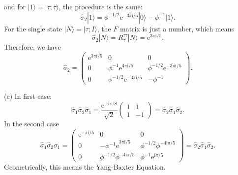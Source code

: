 \documentclass{book}
\begin{document}
and for $|1 \rangle =|\tau ;\tau \rangle $, the procedure is the same:
\begin{equation*}
\hat{\sigma }_{2} |1\rangle =\phi ^{-1/2}\mathrm{e}^{-3\pi \mathrm{i} /5} |0 \rangle -\phi ^{-1} |1 \rangle .
\end{equation*}
For the single state $|N \rangle =|\tau ;I \rangle $, the $F$ matrix is just a number, which means
\begin{equation*}
\hat{\sigma }_{2} |N\rangle =R_{\tau }^{\tau \tau } |N\rangle =\mathrm{e}^{3\pi \mathrm{i} /5} .
\end{equation*}
Therefore, we have
\begin{equation*}
\hat{\sigma }_{2} =\begin{pmatrix}
\mathrm{e}^{3\pi \mathrm{i} /5} & 0 & 0\\
0 & \phi ^{-1}\mathrm{e}^{4\pi \mathrm{i} /5} & \phi ^{-1/2}\mathrm{e}^{-3\pi \mathrm{i} /5}\\
0 & \phi ^{-1/2}\mathrm{e}^{-3\pi \mathrm{i} /5} & -\phi ^{-1}
\end{pmatrix} .
\end{equation*}


(c) In first case:
\begin{equation*}
\hat{\sigma }_{1}\hat{\sigma }_{2}\hat{\sigma }_{1} =\frac{\mathrm{e}^{-\mathrm{i} \pi /8}}{\sqrt{2}}\begin{pmatrix}
1 & 1\\
1 & -1
\end{pmatrix} =\hat{\sigma }_{2}\hat{\sigma }_{1}\hat{\sigma }_{2} .
\end{equation*}
In the second case
\begin{equation*}
\hat{\sigma }_{1}\hat{\sigma }_{2}\hat{\sigma }_{1} =\begin{pmatrix}
\mathrm{e}^{-\pi \mathrm{i} /5} & 0 & 0\\
0 & -\phi \mathrm{^{-1} e}^{3\pi \mathrm{i} /5} & \phi ^{-1/2} \phi ^{-4\mathrm{i} \pi /5}\\
0 & \phi ^{-1/2} \phi ^{-4\mathrm{i} \pi /5} & \phi ^{-1}\mathrm{e}^{\mathrm{i} \pi /5}
\end{pmatrix} =\hat{\sigma }_{2}\hat{\sigma }_{1}\hat{\sigma }_{2} .
\end{equation*}
Geometrically, this means the Yang-Baxter Equation.
\end{document}
